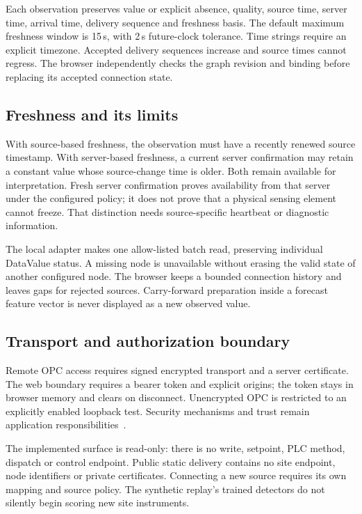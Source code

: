 \documentclass[11pt,a4paper]{article}
\begin{document}
Each observation preserves value or explicit absence, quality, source time, server time, arrival time, delivery sequence and freshness basis. The default maximum freshness window is 15\,s, with 2\,s future-clock tolerance. Time strings require an explicit timezone. Accepted delivery sequences increase and source times cannot regress. The browser independently checks the graph revision and binding before replacing its accepted connection state.

\subsection{Freshness and its limits}
With source-based freshness, the observation must have a recently renewed source timestamp. With server-based freshness, a current server confirmation may retain a constant value whose source-change time is older. Both remain available for interpretation. Fresh server confirmation proves availability from that server under the configured policy; it does not prove that a physical sensing element cannot freeze. That distinction needs source-specific heartbeat or diagnostic information.

The local adapter makes one allow-listed batch read, preserving individual DataValue status. A missing node is unavailable without erasing the valid state of another configured node. The browser keeps a bounded connection history and leaves gaps for rejected sources. Carry-forward preparation inside a forecast feature vector is never displayed as a new observed value.

\subsection{Transport and authorization boundary}
Remote OPC access requires signed encrypted transport and a server certificate. The web boundary requires a bearer token and explicit origins; the token stays in browser memory and clears on disconnect. Unencrypted OPC is restricted to an explicitly enabled loopback test. Security mechanisms and trust remain application responsibilities~\cite{opc-security}.

The implemented surface is read-only: there is no write, setpoint, PLC method, dispatch or control endpoint. Public static delivery contains no site endpoint, node identifiers or private certificates. Connecting a new source requires its own mapping and source policy. The synthetic replay's trained detectors do not silently begin scoring new site instruments.
\end{document}
